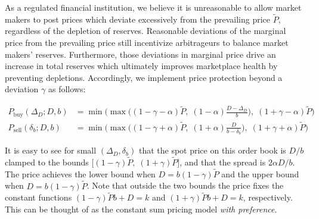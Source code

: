 \documentclass{article}
\begin{document}
As a regulated financial institution, we believe it is unreasonable to allow market makers to post prices which deviate excessively from the prevailing price $\tilde{P}$, regardless of the depletion of reserves. Reasonable deviations of the marginal price from the prevailing price still incentivize arbitrageurs to balance market makers' reserves. Furthermore, those deviations in marginal price drive an increase in total reserves which ultimately improves marketplace health by preventing depletions. Accordingly, we implement price protection beyond a deviation $\gamma$ as follows:

\begin{equation}
\begin{split}
P_{\mathrm{buy}}(\Delta_D; D, b) &= \min \Big( \max \big( (1 - \gamma - \alpha)\tilde{P}, \; (1 - \alpha) \frac{D - \Delta_D}{b} \big), \; (1 + \gamma - \alpha) \tilde{P} \Big) \\
P_{\mathrm{sell}}(\delta_b; D, b) &= \min \Big( \max \big( (1 - \gamma + \alpha) \tilde{P}, \; (1 + \alpha) \frac{D}{b - \delta_b} \big), \; (1 + \gamma + \alpha)\tilde{P} \Big)
\end{split}
\end{equation}

It is easy to see for small $(\Delta_D, \delta_b)$ that the spot price on this order book is $D/b$ clamped to the bounds $\big[ (1 - \gamma) \tilde{P}, \; (1 + \gamma) \tilde{P} \big]$, and that the spread is $2 \alpha D / b$. The price achieves the lower bound when $D = b (1 - \gamma) \tilde{P}$ and the upper bound when $D = b (1 - \gamma) \tilde{P}$. Note that outside the two bounds the price fixes the constant functions $(1 - \gamma) \tilde{P} b + D = k$ and $(1 + \gamma) \tilde{P} b + D = k$, respectively. This can be thought of as the constant sum pricing model \emph{with preference}.


  
\end{document}
